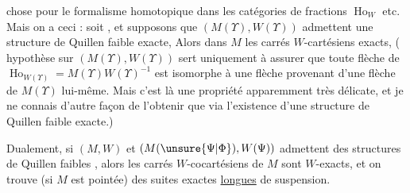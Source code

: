 chose pour le formalisme homotopique dans les catégories de fractions $\operatorname{Ho}_{W}$ etc. Mais on a  ceci : soit
, et supposons que   $(M(\Upsilon),W(\Upsilon))$ admettent une structure de Quillen faible exacte,  Alors dans $M$ les carrés $W$-cartésiens  exacts,   ( hypothèse sur $(M(\Upsilon),W(\Upsilon))$ sert uniquement à assurer que toute flèche de $\operatorname{Ho}_{W(\Upsilon)}=M(\Upsilon)W(\Upsilon)^{-1}$ est isomorphe à une flèche provenant d'une flèche de $M(\Upsilon)$ lui-même. \deleted{\unsure{)}} Mais c'est là une propriété apparemment très délicate, et je ne connais d'autre façon de l'obtenir que via l'existence d'une structure de Quillen faible exacte.)

Dualement, si $(M,W)$ et $(M(\unsure{\Psi|\Phi}),W(\Psi))$ admettent des structures de Quillen faibles , alors les carrés $W$-cocartésiens de $M$ sont $W$-exacts, et on trouve (si $M$ est pointée) des suites exactes \uline{longues} de suspension.
